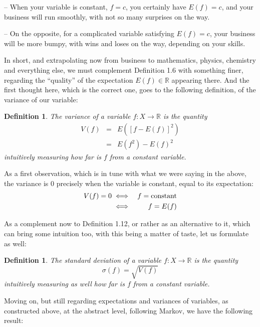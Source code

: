 \documentclass[12pt]{amsbook}
\newtheorem{definition}[theorem]{Definition}
\begin{document}
\medskip

-- When your variable is constant, $f=c$, you certainly have $E(f)=c$, and your business will run smoothly, with not so many surprises on the way.

\medskip

-- On the opposite, for a complicated variable satisfying $E(f)=c$, your business will be more bumpy, with wins and loses on the way, depending on your skills.

\medskip

In short, and extrapolating now from business to mathematics, physics, chemistry and everything else, we must complement Definition 1.6 with something finer, regarding the ``quality'' of the expectation $E(f)\in\mathbb R$ appearing there. And the first thought here, which is the correct one, goes to the following definition, of the variance of our variable:


\begin{definition}
The variance of a variable $f:X\to\mathbb R$ is the quantity
\begin{eqnarray*}
V(f)
&=&E\left([f-E(f)]^2\right)\\
&=&E(f^2)-E(f)^2
\end{eqnarray*}
intuitively measuring how far is $f$ from a constant variable.
\end{definition}

As a first observation, which is in tune with what we were saying in the above, the variance is 0 precisely when the variable is constant, equal to its expectation:
\begin{eqnarray*}
V(f)=0
&\iff&f={\rm constant}\\
&\iff&f=E(f)
\end{eqnarray*}

As a complement now to Definition 1.12, or rather as an alternative to it, which can bring some intuition too, with this being a matter of taste, let us formulate as well:


\begin{definition}
The standard deviation of a variable $f:X\to\mathbb R$ is the quantity
$$\sigma(f)=\sqrt{V(f)}$$
intuitively measuring as well how far is $f$ from a constant variable.
\end{definition}

Moving on, but still regarding expectations and variances of variables, as constructed above, at the abstract level, following Markov, we have the following result:
\end{document}
